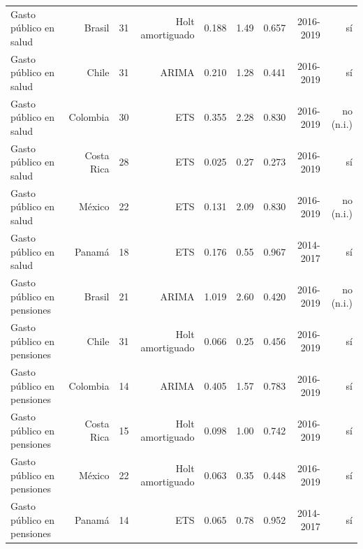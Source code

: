 \begin{tabular}{lrrrrrrrr}
Gasto público en salud & Brasil & 31 & Holt amortiguado & 0.188 & 1.49 & 0.657 & 2016-2019 & sí\\
Gasto público en salud & Chile & 31 & ARIMA & 0.210 & 1.28 & 0.441 & 2016-2019 & sí\\
Gasto público en salud & Colombia & 30 & ETS & 0.355 & 2.28 & 0.830 & 2016-2019 & no (n.i.)\\
Gasto público en salud & Costa Rica & 28 & ETS & 0.025 & 0.27 & 0.273 & 2016-2019 & sí\\
Gasto público en salud & México & 22 & ETS & 0.131 & 2.09 & 0.830 & 2016-2019 & no (n.i.)\\
Gasto público en salud & Panamá & 18 & ETS & 0.176 & 0.55 & 0.967 & 2014-2017 & sí\\
Gasto público en pensiones & Brasil & 21 & ARIMA & 1.019 & 2.60 & 0.420 & 2016-2019 & no (n.i.)\\
Gasto público en pensiones & Chile & 31 & Holt amortiguado & 0.066 & 0.25 & 0.456 & 2016-2019 & sí\\
Gasto público en pensiones & Colombia & 14 & ARIMA & 0.405 & 1.57 & 0.783 & 2016-2019 & sí\\
Gasto público en pensiones & Costa Rica & 15 & Holt amortiguado & 0.098 & 1.00 & 0.742 & 2016-2019 & sí\\
Gasto público en pensiones & México & 22 & Holt amortiguado & 0.063 & 0.35 & 0.448 & 2016-2019 & sí\\
Gasto público en pensiones & Panamá & 14 & ETS & 0.065 & 0.78 & 0.952 & 2014-2017 & sí\\
\bottomrule
\end{tabular}